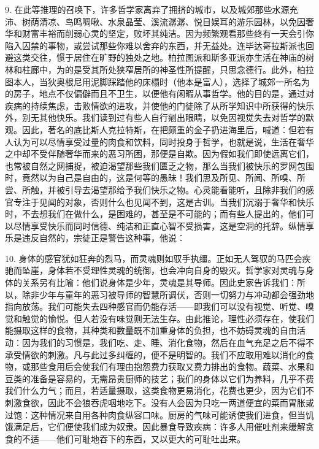 9. 在此等推理的召唤下，许多哲学家离弃了拥挤的城市，以及城郊那些水源充沛、树荫清凉、鸟鸣啁啾、水泉晶莹、溪流潺潺、悦目娱耳的游乐园林，以免因奢华和财富丰裕而削弱心灵的坚定，败坏其纯洁。因为频繁观看那些终有一天会引你陷入囚禁的事物，或尝试那些你难以舍弃的东西，并无益处。连毕达哥拉斯派也回避这类交往，惯于居住在旷野的独处之地。柏拉图派和斯多亚派亦生活在神庙的树林和柱廊中，为的是受其所处狭窄居所的神圣性所提醒，只思念德行。此外，柏拉图本人，当狄奥根尼用泥脚踩踏他的床榻时（他本是富人），选择了城郊一所名为的房子，地点不仅偏僻而且不卫生，以便他有闲暇从事哲学。他的目的是，通过对疾病的持续焦虑，击败情欲的进攻，并使他的门徒除了从所学知识中所获得的快乐外，别无其他快乐。我们读到过有些人自行剜出眼睛，以免因视觉失去对哲学的默观。因此，著名的底比斯人克拉特斯，在把颇重的金子扔进海里后，喊道：但若有人认为可以尽情享受过量的肉食和饮料，同时投身于哲学，也就是说，生活在奢华之中却不受伴随奢华而来的恶习所困，那便是自欺。因为假如我们即使远离它们，也常被自然之网捕捉，被迫渴望那些我们匮乏之物，那么当我们被快乐的罗网包围时，竟然以为自己是自由的，这是何等的愚昧！我们思及所见、所闻、所嗅、所尝、所触，并被引导去渴望那给予我们快乐之物。心灵能看能听，且除非我们的感官专注于见闻的对象，否则什么也见闻不到，这是古训。当我们沉溺于奢华和快乐时，不去想我们在做什么，是困难的，甚至是不可能的；而有些人提出的，他们可以尽情享受快乐而同时信德、纯洁和正直心智不受损害，这是空洞的托辞。纵情享乐是违反自然的，宗徒正是警告这种事，他说： \par

10. 身体的感官犹如狂奔的烈马，而灵魂则如驭手执缰。正如无人驾驭的马匹会疾驰而坠崖，身体若不受理性灵魂的统御，也会冲向自身的毁灭。哲学家对灵魂与身体的关系另有比喻：他们说身体是少年，灵魂是其导师。因此史家告诉我们：所以，除非少年与童年的恶习被导师的智慧所调伏，否则一切努力与冲动都会强劲地指向放荡。我们可能失去四种感官而仍能存活——即我们可以没有视觉、听觉、嗅觉和触觉的愉悦。但人若没有味觉则无法生存。由此推论，理性必须存在，使我们能摄取这样的食物，其种类和数量既不加重身体的负担，也不妨碍灵魂的自由活动：因为我们的习惯是，我们吃、走、睡、消化食物，然后在血气充足之后不得不承受情欲的刺激。凡与此过多纠缠的，便不是明智的。我们不应取用难以消化的食物，或那些食用后会使我们有理由抱怨费力获取又费力排出的食物。蔬菜、水果和豆类的准备是容易的，无需昂贵厨师的技艺；我们的身体以它们为养料，几乎不费我们什么力气；而且，若适量摄取，这类食物更易消化，花费也更少，因为它们不刺激食欲，因此不会狼吞虎咽地吃下。没有人会因为只吃一两道便宜的菜而胃胀或过饱：这种情况来自用各种肉食纵容口味。厨房的气味可能诱使我们进食，但当饥饿满足后，它们便使我们成为奴隶。因此暴食导致疾病：许多人用催吐剂来缓解贪食的不适——他们可耻地吞下的东西，又以更大的可耻吐出来。\par

